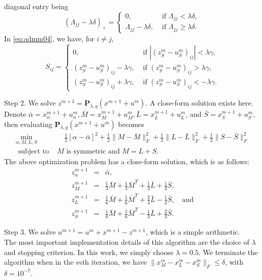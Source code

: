 \documentclass[AMS,STIX1COL]{WileyNJD-v2}
\begin{document}
{diagonal entry being
$$
(\Lambda_{jj}-\lambda \delta)_+ = \left\{
\begin{array}{ll}
0, & \mbox{ if } \Lambda_{jj} < \lambda \delta, \\
\Lambda_{jj}-\lambda \delta, & \mbox{ if } \Lambda_{jj} \ge \lambda \delta .
\end{array}
\right.
$$
In \eqref{eq:admm04}, we have, for $i \neq j$,
\[
S_{ij} = \left\{
\begin{array}{ll}
0, & \mbox{ if } |(z^m_S - u^m_S)_{ij}| < \lambda \gamma,  \\
(z^m_S - u^m_S)_{ij}-\lambda\gamma , &
\mbox{ if } (z^m_S - u^m_S)_{ij} > \lambda \gamma, \\
(z^m_S - u^m_S)_{ij}+\lambda\gamma , &
\mbox{ if } (z^m_S - u^m_S)_{ij} <- \lambda \gamma.
\end{array}
\right.
\]


\noindent
Step 2. We solve $z^{m+1} = \mathbf{P}_{\lambda,g}(x^{m+1} + u^m)$.
A close-form solution exists here.
Denote
$
\bar{\alpha} = x^{m+1}_\alpha + u^m_\alpha,
\bar{M} = x^{m+1}_M + u^m_M,
\bar{L} = x^{m+1}_L + u^m_L$, and
$\bar{S} = x^{m+1}_S + u^m_S,
$
then evaluating $\mathbf{P}_{\lambda,g}(x^{m+1} + u^m)$ becomes
\begin{eqnarray*}
\min_{\alpha,M,L,S} & \quad
\frac{1}{2}[\alpha - \bar{\alpha}]^2
+ \frac{1}{2}\|M - \bar{M}\|^2_F
+ \frac{1}{2}\|L - \bar{L}\|^2_F
+ \frac{1}{2}\|S - \bar{S}\|^2_F  \\
\mbox{ subject to } & M \mbox{ is symmetric and } M=L+S.
\end{eqnarray*}
The above optimization problem has a close-form solution, which is as follows:
\begin{eqnarray*}
z^{m+1}_\alpha &=& \bar{\alpha}, \\
z^{m+1}_M &=&
\frac{1}{3} \bar{M} + \frac{1}{3} \bar{M}^T + \frac{1}{3} \bar{L} + \frac{1}{3} \bar{S}, \\
z^{m+1}_L &=&
\frac{1}{6} \bar{M} + \frac{1}{6} \bar{M}^T + \frac{2}{3} \bar{L} - \frac{1}{3} \bar{S},
\quad \text{and} \\
z^{m+1}_S &=&
\frac{1}{6} \bar{M} + \frac{1}{6} \bar{M}^T - \frac{1}{3} \bar{L} + \frac{2}{3} \bar{S}.
\end{eqnarray*}

\noindent
Step 3. We solve $u^{m+1} = u^m + x^{m+1} - z^{m+1}$, which is a simple arithmetic. \\

The most important implementation details of this algorithm are the choice of $\lambda$ and stopping criterion.
In this work, we simply choose $\lambda = 0.5$.
We terminate the algorithm  when in the $m$th iteration, we have $\|x^{m}_M - x^{m}_L - x^{m}_S\|_F \leq \delta$, with $\delta=10^{-7}$.

}
\end{document}
